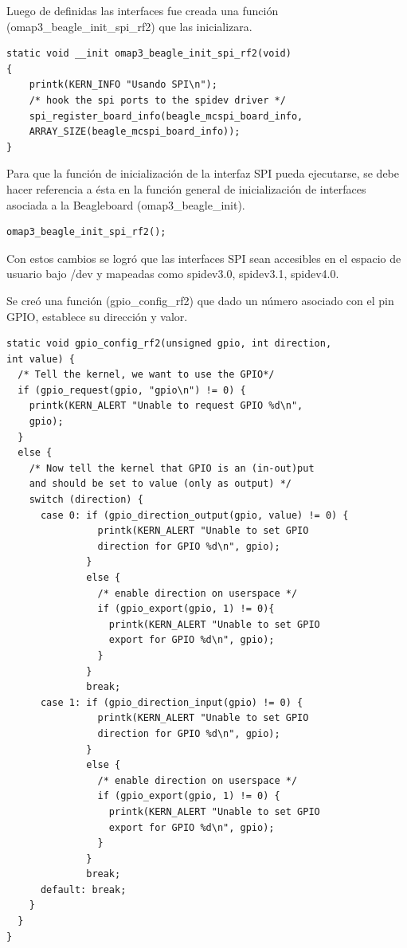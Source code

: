 \newpage
Luego de definidas las interfaces fue creada una función (omap3\_beagle\_init\_spi\_rf2) que las inicializara.

\begin{verbatim}
static void __init omap3_beagle_init_spi_rf2(void) 
{ 
    printk(KERN_INFO "Usando SPI\n");  
    /* hook the spi ports to the spidev driver */ 
    spi_register_board_info(beagle_mcspi_board_info, 
    ARRAY_SIZE(beagle_mcspi_board_info)); 
}
\end{verbatim}

Para que la función de inicialización de la interfaz SPI pueda ejecutarse, se debe hacer referencia a ésta en la función general de inicialización de interfaces asociada a la Beagleboard (omap3\_beagle\_init).

\begin{verbatim}
omap3_beagle_init_spi_rf2();
\end{verbatim}

Con estos cambios se logró que las interfaces SPI sean accesibles en el espacio de usuario bajo /dev y mapeadas como spidev3.0, spidev3.1, spidev4.0.

\bigskip
{}

\bigskip
Se creó una función (gpio\_config\_rf2) que dado un número asociado con el pin GPIO, establece su dirección y valor.

\begin{verbatim}
static void gpio_config_rf2(unsigned gpio, int direction, 
int value) {
  /* Tell the kernel, we want to use the GPIO*/
  if (gpio_request(gpio, "gpio\n") != 0) {
    printk(KERN_ALERT "Unable to request GPIO %d\n", 
    gpio);
  }
  else {
    /* Now tell the kernel that GPIO is an (in-out)put 
    and should be set to value (only as output) */
    switch (direction) {
      case 0: if (gpio_direction_output(gpio, value) != 0) {
                printk(KERN_ALERT "Unable to set GPIO 
                direction for GPIO %d\n", gpio);
              }
              else {
                /* enable direction on userspace */
                if (gpio_export(gpio, 1) != 0){ 
                  printk(KERN_ALERT "Unable to set GPIO 
                  export for GPIO %d\n", gpio);
                }
              }
              break;
      case 1: if (gpio_direction_input(gpio) != 0) {
                printk(KERN_ALERT "Unable to set GPIO 
                direction for GPIO %d\n", gpio);
              }
              else {
                /* enable direction on userspace */
                if (gpio_export(gpio, 1) != 0) { 
                  printk(KERN_ALERT "Unable to set GPIO 
                  export for GPIO %d\n", gpio);
                }
              }
              break;
      default: break;
    }
  }	
}
\end{verbatim}

